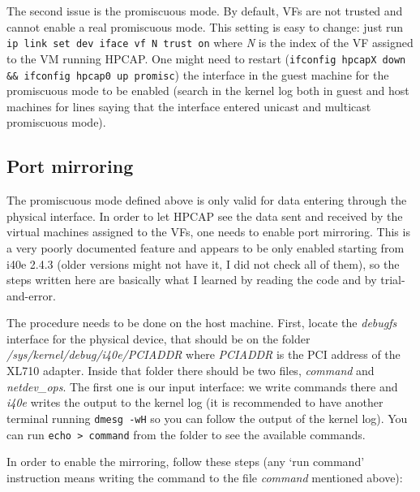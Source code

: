The second issue is the promiscuous mode. By default, VFs are not trusted and cannot enable a real promiscuous mode. This setting is easy to change: just run \texttt{ip link set dev iface vf N trust on} where \textit{N} is the index of the VF assigned to the VM running HPCAP. One might need to restart (\texttt{ifconfig hpcapX down \&\& ifconfig hpcap0 up promisc}) the interface in the guest machine for the promiscuous mode to be enabled (search in the kernel log both in guest and host machines for lines saying that the interface entered unicast and multicast promiscuous mode).

\subsection{Port mirroring}

The promiscuous mode defined above is only valid for data entering through the physical interface. In order to let HPCAP see the data sent and received by the virtual machines assigned to the VFs, one needs to enable port mirroring. This is a very poorly documented feature and appears to be only enabled starting from i40e 2.4.3 (older versions might not have it, I did not check all of them), so the steps written here are basically what I learned by reading the code and by trial-and-error.

The procedure needs to be done on the host machine. First, locate the \textit{debugfs} interface for the physical device, that should be on the folder \textit{/sys/kernel/debug/i40e/PCIADDR} where \textit{PCIADDR} is the PCI address of the XL710 adapter. Inside that folder there should be two files, \textit{command} and \textit{netdev\_ops}. The first one is our input interface: we write commands there and \textit{i40e} writes the output to the kernel log (it is recommended to have another terminal running \texttt{dmesg -wH} so you can follow the output of the kernel log). You can run \texttt{echo > command} from the folder to see the available commands.

In order to enable the mirroring, follow these steps (any `run command' instruction means writing the command to the file \textit{command} mentioned above):

